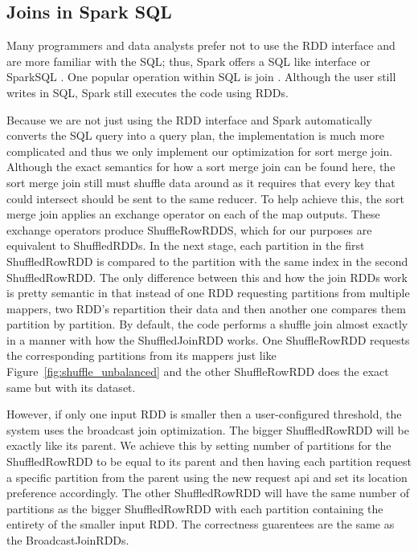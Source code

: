 \subsection{Joins in Spark SQL}

Many programmers and data analysts prefer not to use the RDD interface
and are more familiar with the SQL; thus, Spark offers a SQL like interface or SparkSQL \cite{SparkSql}. One popular operation within SQL is join \cite{MapReduce}.
Although the user still writes in SQL, Spark still executes the code using RDDs.

Because we are not just using the RDD interface and Spark automatically converts the SQL query into a query plan,
the implementation is much more complicated and thus we only implement our optimization for sort merge join.
Although the exact semantics for how a sort merge join can be found here\cite{sortmerge}, the sort merge join still must shuffle data around as it requires that every
key that could intersect should be sent to the same reducer.
To help achieve this, the sort merge join applies an exchange operator on each of the map outputs. These exchange operators produce
ShuffleRowRDDS, which for our purposes are equivalent to ShuffledRDDs. In the next stage, each partition in the first ShuffledRowRDD is compared
to the partition with the same index in the second ShuffledRowRDD. The only difference between this and how the join RDDs work is pretty semantic
in  that instead of one RDD requesting partitions from multiple mappers, two RDD's repartition their data and then another one compares them partition by partition.
By default, the code performs a shuffle join almost exactly in a manner with how the ShuffledJoinRDD works. One ShuffleRowRDD requests 
the corresponding partitions from its mappers just like Figure~\ref{fig:shuffle_unbalanced} and the other ShuffleRowRDD does the exact same but with its dataset.  

However, if only one input RDD is smaller then a user-configured threshold, the system uses the broadcast join optimization. The bigger ShuffledRowRDD will be exactly like its
parent. We achieve this by setting number of partitions for the ShuffledRowRDD to be equal to its parent and then having each partition request a specific partition from the parent using the new request api and set its location preference accordingly. The other ShuffledRowRDD will have the same number of partitions as the bigger ShuffledRowRDD with each partition containing the entirety of the smaller input RDD. 
The correctness guarentees are the same as the BroadcastJoinRDDs.  


